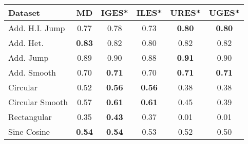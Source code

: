 \begin{tabular}{lccccc}
\toprule
Dataset & MD & IGES* & ILES* & URES* & UGES* \\
\midrule
Add. H.I. Jump & 0.77 & 0.78 & 0.73 & \textbf{0.80} & \textbf{0.80} \\
Add. Het. & \textbf{0.83} & 0.82 & 0.80 & 0.82 & 0.82 \\
Add. Jump & 0.89 & 0.90 & 0.88 & \textbf{0.91} & 0.90 \\
Add. Smooth & 0.70 & \textbf{0.71} & 0.70 & \textbf{0.71} & \textbf{0.71} \\
Circular & 0.52 & \textbf{0.56} & \textbf{0.56} & 0.38 & 0.38 \\
Circular Smooth & 0.57 & \textbf{0.61} & \textbf{0.61} & 0.45 & 0.39 \\
Rectangular & 0.35 & \textbf{0.43} & 0.37 & 0.01 & 0.01 \\
Sine Cosine & \textbf{0.54} & \textbf{0.54} & 0.53 & 0.52 & 0.50 \\
\bottomrule
\end{tabular}